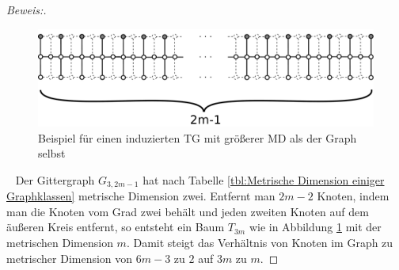 \vspace{-6mm}
\begin{proof}[Beweis:]$\;$
\begin{figure}[h!]
		\centering 		 
\includegraphics[width=420pt]{bilder/gitterzubaumlsch.pdf}
   \caption{Beispiel für einen induzierten TG mit größerer MD als der Graph selbst}
   \label{bild:Gitterbaum2}
  	 \end{figure}
~ \linebreak
Der Gittergraph $G_{3,2m-1}$ hat nach Tabelle \ref{tbl:Metrische Dimension einiger Graphklassen} metrische Dimension zwei. Entfernt man $2m-2$ Knoten, indem man die Knoten vom Grad zwei behält und jeden zweiten Knoten auf dem äußeren Kreis entfernt, so entsteht ein Baum $T_{3m}$ wie in Abbildung \ref{bild:Gitterbaum2} mit der metrischen Dimension $m$. Damit steigt das Verhältnis von Knoten im Graph zu metrischer Dimension von $6m-3\text{ zu }2$ auf $3m\text{ zu }m$.
\end{proof}

